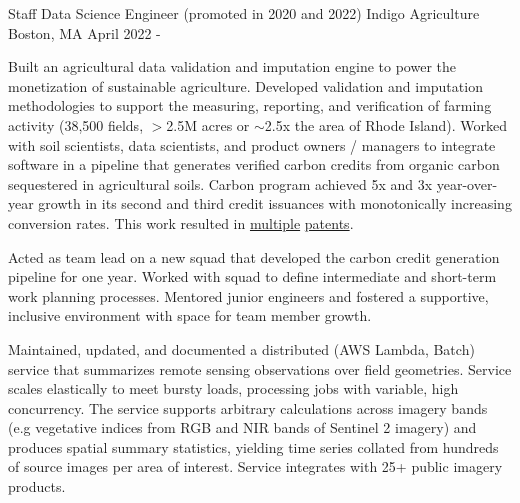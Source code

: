 

\begin{cventries}

  \cventry
    {Staff Data Science Engineer (promoted in 2020 and 2022)} %
    {Indigo Agriculture} %
    {Boston, MA} %
    {April 2022 -} %
    {
      \begin{cvitems} %
        \item {
            Built an agricultural data validation and imputation engine 
            to power the monetization of sustainable agriculture. 
            Developed validation and imputation methodologies to 
            support the measuring, reporting, and verification of 
            farming activity (38,500 fields, $>$2.5M acres or $\sim$2.5x the
            area of Rhode Island). Worked with soil 
            scientists, data scientists, and product owners / managers 
            to integrate software in a pipeline that generates 
            verified carbon credits from organic carbon sequestered in 
            agricultural soils. Carbon program achieved 
            5x and 3x year-over-year growth in its second 
            and third credit issuances with monotonically increasing conversion 
            rates. This work resulted in 
            \href{https://patents.google.com/patent/US20230186408A1}{multiple} 
            \href{https://patents.google.com/patent/US20230078852A1}{patents}.
        }
        \item {
            Acted as team lead on a new squad that developed the carbon credit generation pipeline
            for one year. Worked with squad to define intermediate and short-term work planning processes.
            Mentored junior engineers and fostered a supportive, inclusive environment with space for
            team member growth.
        }
        \item {
            Maintained, updated, and documented a distributed (AWS Lambda, Batch) service 
            that summarizes remote sensing observations over field geometries. Service scales elastically
            to meet bursty loads, processing jobs with variable, high concurrency. The service supports
            arbitrary calculations across imagery bands (e.g vegetative indices from RGB and NIR bands of Sentinel 2 imagery)
            and produces spatial summary statistics, yielding time series collated from hundreds of source images
            per area of interest. Service integrates with 25+ public imagery products.
        }
      \end{cvitems}
    }


\end{cventries}
